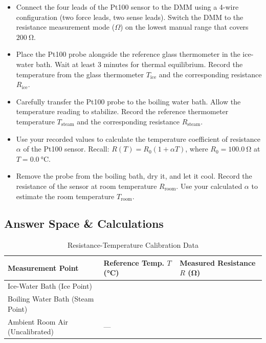 \begin{itemize}[label=\checkbox, leftmargin=*, itemsep=0.8em]
    \item Connect the four leads of the Pt100 sensor to the DMM using a 4-wire configuration (two force leads, two sense leads). Switch the DMM to the resistance measurement mode ($\Omega$) on the lowest manual range that covers $\SI{200}{\ohm}$. 
    
    \item Place the Pt100 probe alongside the reference glass thermometer in the ice-water bath. Wait at least 3 minutes for thermal equilibrium. Record the temperature from the glass thermometer $T_{\text{ice}}$ and the corresponding resistance $R_{\text{ice}}$. 
    
    \item Carefully transfer the Pt100 probe to the boiling water bath. Allow the temperature reading to stabilize. Record the reference thermometer temperature $T_{\text{steam}}$ and the corresponding resistance $R_{\text{steam}}$. 
    
    \item Use your recorded values to calculate the temperature coefficient of resistance $\alpha$ of the Pt100 sensor. Recall: $R(T) = R_0(1 + \alpha T)$, where $R_0 = \SI{100.0}{\ohm}$ at $T = \SI{0.0}{\celsius}$. 
    
    \item Remove the probe from the boiling bath, dry it, and let it cool. Record the resistance of the sensor at room temperature $R_{\text{room}}$. Use your calculated $\alpha$ to estimate the room temperature $T_{\text{room}}$. 
\end{itemize}

\subsection{Answer Space \& Calculations}


\newpage

\begin{table}[h!]
\centering
\sffamily
\renewcommand{\arraystretch}{1.4}
\begin{tabularx}{\textwidth}{|X|Y|Y|}
    \hline
    \textbf{Measurement Point} & \textbf{Reference Temp. $T$ (\si{\celsius})} & \textbf{Measured Resistance $R$ (\si{\ohm})} \\
    \hline
    Ice-Water Bath (Ice Point) & & \\
    \hline
    Boiling Water Bath (Steam Point) & & \\
    \hline
    Ambient Room Air (Uncalibrated) & --- & \\
    \hline
\end{tabularx}
\caption{Resistance-Temperature Calibration Data}
\label{tab:thermo_data}
\end{table}


